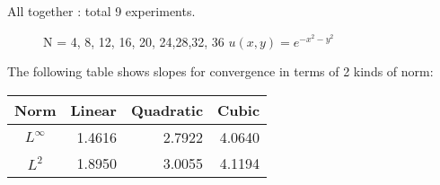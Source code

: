 \documentclass[11pt, notitlepage,  letterpaper]{article}
\begin{document}
\newpage
All together : total 9 experiments.
\begin{figure}[h]
    \begin{center}
    \caption{\label{scrvsol2} N = 4, 8, 12, 16, 20, 24,28,32, 36 $u(x,y) = e^{- x^2 - y^2}$}
    \end{center}
\end{figure}

The following table shows slopes for convergence in terms of 2 kinds of norm:
\begin{center}
\begin{tabular}{|c||r|r|r|}  \hline
Norm  & Linear & Quadratic & Cubic\\ \hline \hline
$L^{\infty}$&1.4616&2.7922&4.0640 \\\hline
$L^2$&1.8950&3.0055&4.1194\\\hline
\end{tabular}
\end{center}
\end{document}
